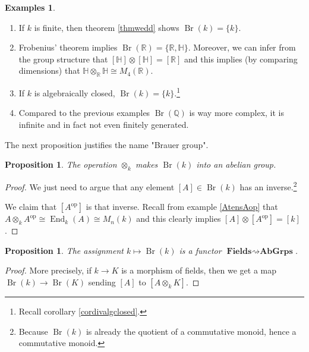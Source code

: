 \documentclass{tufte-handout} %
\newtheorem{prop}[thm]{Proposition}
\theoremstyle{definition}
\newtheorem{exmps}[thm]{Examples}
\theoremstyle{remark}
\newcommand{\op}[1]{#1^{\text{op}}}
\newcommand{\R}{\mathbb{R}}
\newcommand{\Q}{\mathbb{Q}}
\newcommand{\bH}{\mathbb{H}}
\DeclareMathOperator{\End}{End}
\DeclareMathOperator{\Br}{Br}
\begin{document}
\begin{exmps}
	\begin{enumerate}
		\item If $k$ is finite, then theorem \ref{thmwedd} shows $\Br(k) = \{k\}$.
		\item Frobenius' theorem implies $\Br(\R) = \{\R, \bH\}$. Moreover, we can infer from the group structure that $[\bH]\otimes [\bH]  =[\R]$ and this implies (by comparing dimensions) that $\bH \otimes_{\R} \bH \cong M_4(\R)$.
		\item If $k$ is algebraically closed, $\Br(k) =\{k\}$.\footnote{Recall corollary \ref{cordivalgclosed}.}
		\item Compared to the previous examples $\Br(\Q)$ is way more complex, it is infinite and in fact not even finitely generated.
	\end{enumerate}
\end{exmps}
The next proposition justifies the name "Brauer group".
\begin{prop}
	The operation $\otimes_k$ makes $\Br(k)$ into an abelian group.
\end{prop}
\begin{proof}
	We just need to argue that any element $[A] \in \Br(k)$ has an inverse.\footnote{Because $\Br(k)$ is already the quotient of a commutative monoid, hence a commutative monoid.}
	
	We claim that $[\op{A}]$ is that inverse. Recall from example \ref{AtensAop} that $A \otimes_k \op{A} \cong \End_k(A) \cong M_n(k)$ and this clearly implies $[A]\otimes [\op{A}] = [k]$.
\end{proof}

\begin{prop}
	The assignment $k \mapsto \Br(k)$ is a functor $\textbf{Fields} \rightsquigarrow \textbf{AbGrps}$.
\end{prop}
\begin{proof}
	 More precisely, if $k \rightarrow K$ is a morphism of fields, then we get a map $\Br(k) \rightarrow \Br(K)$ sending $[A]$ to $[A \otimes_k K]$. %
\end{proof}
\end{document}
